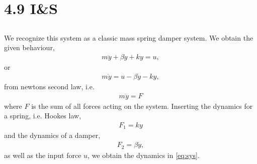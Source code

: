 \documentclass[]{article}
\title{}
\author{Sigurd Totland | MTTK}
\begin{document}
\maketitle

\section{4.9 I\&S}
\subsection{}
We recognize this system as a classic mass spring damper system. We obtain the given behaviour,
\begin{equation}\begin{aligned}
\label{eq:sys}
m \ddot y + \beta \dot y + k y = u,
\end{aligned}\end{equation}
or
\begin{equation}\begin{aligned}
m \ddot y = u -\beta \dot y - k y,
\end{aligned}\end{equation}
from newtons second law, i.e.
\begin{equation}\begin{aligned}
m \ddot y = F
\end{aligned}\end{equation}
where $F$ is the sum of all forces acting on the system. Inserting the dynamics for a spring, i.e. Hookes law,
\begin{equation}\begin{aligned}
F_1 = ky
\end{aligned}\end{equation}
and the dynamics of a damper,
\begin{equation}\begin{aligned}
F_2 = \beta \dot y,
\end{aligned}\end{equation}
as well as the input force $u$, we obtain the dynamics in \eqref{eq:sys}.
\end{document}
